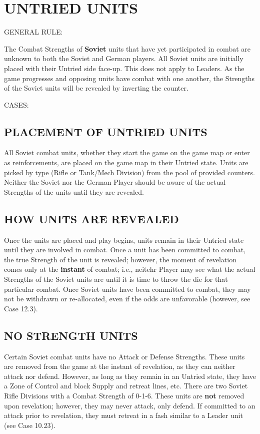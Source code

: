 \section{UNTRIED UNITS}

GENERAL RULE:

The Combat Strengths of \textbf{Soviet} units that have yet participated in combat are unknown to both the Soviet and German players. All Soviet units are initially placed with their Untried side face-up. This does not apply to Leaders. As the game progresses and opposing units have combat with one another, the Strengths of the Soviet units will be revealed by inverting the counter.

CASES:

\begin{flushleft}
  \subsection{PLACEMENT OF UNTRIED UNITS}
\end{flushleft}

All Soviet combat units, whether they start the game on the game map or enter as reinforcements, are placed on the game map in their Untried state. Units are picked by type (Rifle or Tank/Mech Division) from the pool of provided counters. Neither the Soviet nor the German Player should be aware of the actual Strengths of the units until they are revealed.

\subsection{HOW UNITS ARE REVEALED}

Once the units are placed and play begins, units remain in their Untried state until they are involved in combat. Once a unit has been committed to combat, the true Strength of the unit is revealed; however, the moment of revelation comes only at the \textbf{instant} of combat; i.e., neitehr Player may see what the actual Strengths of the Soviet units are until it is time to throw the die for that particular combat. Once Soviet units have been committed to combat, they may not be withdrawn or re-allocated, even if the odds are unfavorable (however, see Case 12.3).

\subsection{NO STRENGTH UNITS}

Certain Soviet combat units have no Attack or Defense Strengths. These units are removed from the game at the instant of revelation, as they can neither attack nor defend. However, as long as they remain in an Untried state, they have a Zone of Control and block Supply and retreat lines, etc. There are two Soviet Rifle Divisions with a Combat Strength of 0-1-6. These units are \textbf{not} removed upon revelation; however, they may never attack, only defend. If committed to an attack prior to revelation, they must retreat in a fash similar to a Leader unit (see Case 10.23).

